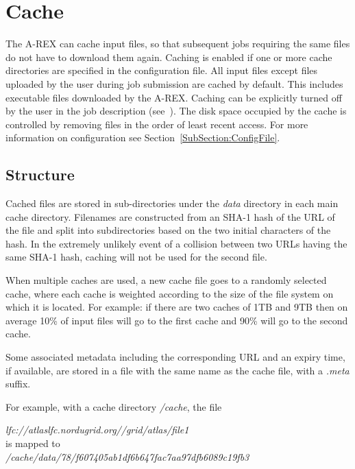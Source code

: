 \documentclass{article}                            %
\begin{document}
\section{Cache\label{sec:cache}}

The A-REX can cache input files, so that subsequent jobs requiring the
same files do not have to download them again. Caching is enabled if
one or more cache directories are specified in the configuration
file. All input files except files uploaded by the user during job
submission are cached by default. This includes executable files
downloaded by the A-REX. Caching can be explicitly turned off by the
user in the job description (see~\cite{userguide1}). The disk space
occupied by the cache is controlled by removing files in the order of
least recent access. For more information on configuration see
Section~\ref{SubSection:ConfigFile}.

\subsection{Structure}

Cached files are stored in sub-directories under the \emph{data}
directory in each main cache directory. Filenames are constructed from
an SHA-1 hash of the URL of the file and split into subdirectories
based on the two initial characters of the hash. In the extremely
unlikely event of a collision between two URLs having the same SHA-1
hash, caching will not be used for the second file.

When multiple caches are used, a new cache file goes to a randomly
selected cache, where each cache is weighted according to the size of
the file system on which it is located.  For example: if there are two
caches of 1TB and 9TB then on average 10\% of input files will go to
the first cache and 90\% will go to the second cache.

Some associated metadata including the corresponding URL and an expiry
time, if available, are stored in a file with the same name as the
cache file, with a \emph{.meta} suffix.

For example, with a cache directory \emph{/cache}, the file 

\begin{center}
\emph{lfc://atlaslfc.nordugrid.org//grid/atlas/file1 }\\
is mapped to\\
\emph{/cache/data/78/f607405ab1df6b647fac7aa97dfb6089c19fb3}
\par\end{center}
\end{document}
